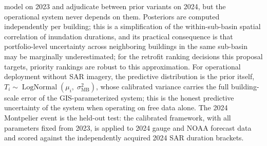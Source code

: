 \documentclass[11pt]{article}
\begin{document}
model on 2023 and adjudicate between prior variants on 2024, but the operational
system never depends on them.
Posteriors are computed independently per building; this is a simplification of
the within-sub-basin spatial correlation of inundation durations, and its practical
consequence is that portfolio-level uncertainty across neighboring buildings in the
same sub-basin may be marginally underestimated; for the retrofit ranking decisions
this proposal targets, priority rankings are robust to this approximation.
For operational deployment without SAR imagery, the predictive distribution is
the prior itself, $T_i \sim \operatorname{LogNormal}(\mu_i,\;
\sigma_{\mathrm{MB}}^2)$, whose calibrated variance carries the full
building-scale error of the GIS-parameterized system; this is the honest
predictive uncertainty of the system when operating on free data alone.
The 2024 Montpelier event is the held-out test: the calibrated framework, with
all parameters fixed from 2023, is applied to 2024 gauge and NOAA forecast data
and scored against the independently acquired 2024 SAR duration brackets.
\end{document}
